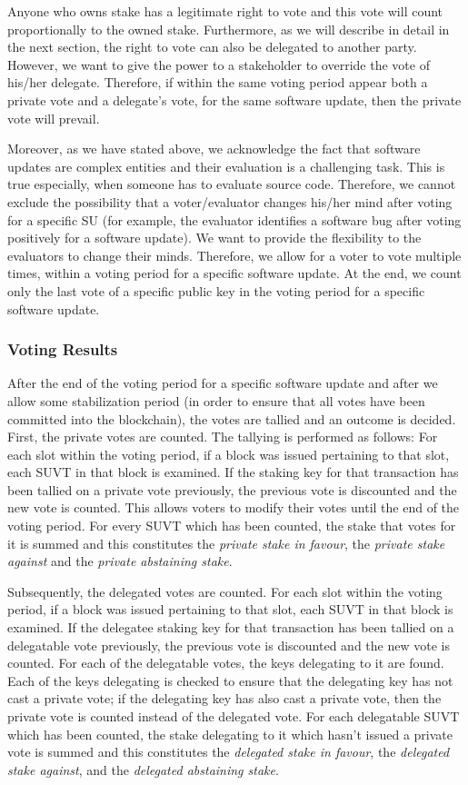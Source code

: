 Anyone who owns stake has a legitimate right to vote and this vote will count proportionally to the owned stake. Furthermore, as we will describe in detail in the next section, the right to vote can also be delegated to another party. However, we want to give the power to a stakeholder to override the vote of his/her delegate. Therefore, if within the same voting period appear both a private vote and a delegate's vote, for the same software update, then the private vote will prevail.

Moreover, as we have stated above, we acknowledge the fact that software updates are complex entities and their evaluation is a challenging task. This is true especially, when someone has to evaluate source code. Therefore, we cannot exclude the possibility that a voter/evaluator changes his/her mind after voting for a specific SU (for example, the evaluator identifies a software bug after voting positively for a software update). We want to provide the flexibility to the evaluators to change their minds. Therefore, we allow for a voter to vote multiple times, within a voting period for a specific software update. At the end, we count only the last vote of a specific public key in the voting period for a specific software update.

\subsubsection{Voting Results}
After the end of the voting period for a specific software update and after we allow some stabilization period (in order to ensure that all votes have been committed into the blockchain), the votes are tallied and an outcome is decided. First, the private votes are counted. The tallying is performed as follows: For each slot within the voting period, if a block was issued pertaining to that slot, each SUVT in that block is examined. If the staking key for that transaction has been tallied on a private vote previously, the previous vote is discounted and the new vote is counted. This allows voters to modify their votes until the end of the voting period. For every SUVT which has been counted, the stake that votes for it is summed and this constitutes the \emph{private stake in favour}, the \emph{private stake against} and the \emph{private abstaining stake}. 

Subsequently, the delegated votes are counted. For each slot within the voting period, if a block was issued pertaining to that slot, each SUVT in that block is examined. If the delegatee staking key for that transaction has been tallied on a delegatable vote previously, the previous vote is discounted and the new vote is counted. For each of the delegatable votes, the keys delegating to it are found. Each of the keys delegating is checked to ensure that the delegating key has not cast a private vote; if the delegating key has also cast a private vote, then the private vote is counted instead of the delegated vote. For each delegatable SUVT which has been counted, the stake delegating to it which hasn't issued a private vote is summed and this constitutes the \emph{delegated stake in favour}, the \emph{delegated stake against}, and the \emph{delegated abstaining stake}.

